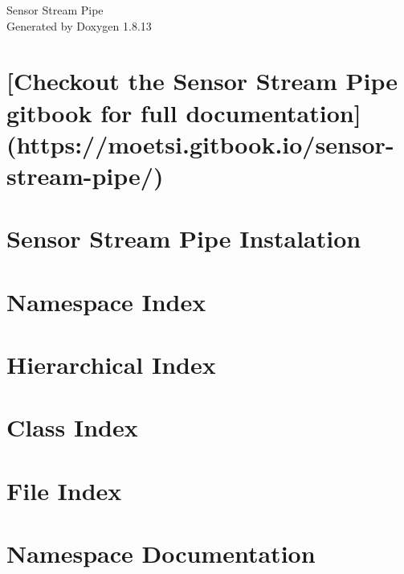 \documentclass[twoside]{book}
\newcommand{\+}{\discretionary{\mbox{\scriptsize$\hookleftarrow$}}{}{}}
\newcommand{\clearemptydoublepage}{%
  \newpage{\pagestyle{empty}\cleardoublepage}%
}
\begin{document}
\hypersetup{pageanchor=false,
             bookmarksnumbered=true,
             pdfencoding=unicode
            }
\begin{titlepage}
\vspace*{7cm}
\begin{center}%
{\Large Sensor Stream Pipe }\\
\vspace*{1cm}
{\large Generated by Doxygen 1.8.13}\\
\end{center}
\end{titlepage}
\clearemptydoublepage
{}
\tableofcontents
\clearemptydoublepage
{}
\hypersetup{pageanchor=true}

\chapter{\mbox{[}Checkout the Sensor Stream Pipe gitbook for full documentation\mbox{]}(https\+://moetsi.gitbook.\+io/sensor-\/stream-\/pipe/)}
\label{index}\hypertarget{index}{}
\chapter{Sensor Stream Pipe Instalation}
\label{md_INSTALL}

\chapter{Namespace Index}

\chapter{Hierarchical Index}

\chapter{Class Index}

\chapter{File Index}

\chapter{Namespace Documentation}


\end{document}
